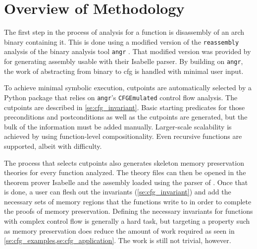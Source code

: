 \section{Overview of Methodology}\label{se:cfg_overview}
The first step in the process of analysis for a function
is disassembly of an \gls{arch} binary containing it.
This is done using a modified version of the \lstinline|reassembly| analysis
\autocite{wang2017ramblr} of the binary analysis tool \texttt{angr} \autocite{shoshitaishvili2016state,wang2017angr}.%
That modified version was provided by \textcite{roessle2019}
for generating assembly usable with their Isabelle parser.%
By building on \texttt{angr},
the work of abstracting from binary to \ac{cfg} is handled with minimal user input.

To achieve minimal symbolic execution, cutpoints%
are automatically selected by a Python package that relies on
\texttt{angr}'s \lstinline|CFGEmulated| control flow analysis.%
The cutpoints are described in \cref{se:cfg_invariant}.
Basic starting predicates for those preconditions and postconditions%
%
as well as the cutpoints are generated,
but the bulk of the information must be added manually.
Larger-scale scalability is achieved by using function-level compositionality.
Even recursive functions are supported, albeit with difficulty.%

The process that selects cutpoints%
also generates skeleton memory preservation theories for every function analyzed.
The theory files can then be opened in the theorem prover Isabelle
and the assembly loaded using the parser of \textcite{roessle2019}.
Once that is done, a user can flesh out the invariants (\cref{se:cfg_invariant})
and add the necessary sets of memory regions that the functions write to
in order to complete the proofs of memory preservation.
Defining the necessary invariants for functions with complex control flow
is generally a hard task, but targeting a property such as memory preservation
does reduce the amount of work required
as seen in \cref{se:cfg_examples,se:cfg_application}.
The work is still not trivial, however.

